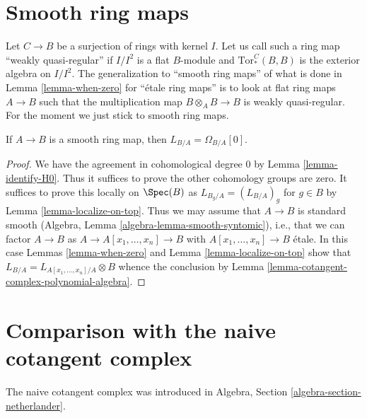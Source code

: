 \section{Smooth ring maps}
\label{section-smooth}

\noindent
Let $C \to B$ be a surjection of rings with kernel $I$. Let us call such
a ring map ``weakly quasi-regular'' if $I/I^2$ is a flat $B$-module and
$\text{Tor}_*^C(B, B)$ is the exterior algebra on $I/I^2$.
The generalization to ``smooth ring maps'' of what is done in
Lemma \ref{lemma-when-zero} for ``\'etale ring maps'' is to look
at flat ring maps $A \to B$ such that the multiplication map
$B \otimes_A B \to B$ is weakly quasi-regular. For the moment we just stick to
smooth ring maps.

\begin{lemma}
\label{lemma-when-projective}
If $A \to B$ is a smooth ring map, then $L_{B/A} = \Omega_{B/A}[0]$.
\end{lemma}

\begin{proof}
We have the agreement in cohomological degree $0$ by
Lemma \ref{lemma-identify-H0}.
Thus it suffices to prove the other cohomology groups
are zero. It suffices to prove this locally on $\Spec(B)$ as
$L_{B_g/A} = (L_{B/A})_g$ for $g \in B$ by Lemma \ref{lemma-localize-on-top}.
Thus we may assume that $A \to B$ is standard smooth
(Algebra, Lemma \ref{algebra-lemma-smooth-syntomic}), i.e.,
that we can factor $A \to B$ as
$A \to A[x_1, \ldots, x_n] \to B$ with $A[x_1, \ldots, x_n] \to B$
\'etale. In this case Lemmas \ref{lemma-when-zero} and
Lemma \ref{lemma-localize-on-top} show that
$L_{B/A} = L_{A[x_1, \ldots, x_n]/A} \otimes B$
whence the conclusion by
Lemma \ref{lemma-cotangent-complex-polynomial-algebra}.
\end{proof}





\section{Comparison with the naive cotangent complex}
\label{section-surjections}

\noindent
The naive cotangent complex was introduced in
Algebra, Section \ref{algebra-section-netherlander}.

